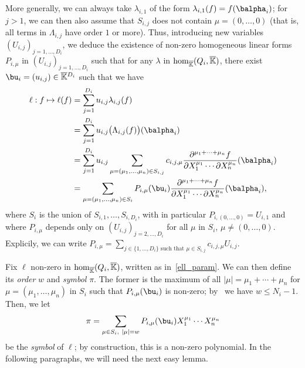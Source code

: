 \documentclass[12pt]{article}
\def\Kbar {{\ensuremath{\overline{\mathbb{K}}}}}
\begin{document}
More generally, we can always take $\lambda_{i,1}$ of the form
$\lambda_{i,1}(f) = f(\balpha_i)$; for $j>1$, we can then also assume
that $S_{i,j}$ does not contain $\mu=(0,\dots,0)$ (that is, all terms
in $\Lambda_{i,j}$ have order $1$ or more). Thus, introducing new
variables $(U_{i,j})_{j =1,\dots,D_i}$, we deduce the existence of
non-zero homogeneous linear forms $P_{i,\mu}$ in
$(U_{i,j})_{j=1,\dots,D_i}$ such that for any $\lambda$ in ${\rm
	hom}_\Kbar(Q_i,\Kbar)$, there exist $\bu_i=(u_{i,j}) \in
\Kbar{}^{D_i}$ such that we have
\begin{align}\label{ell_param}
\ell: f \mapsto \ell(f)
&= \sum_{j=1}^{D_i} u_{i,j} \lambda_{i,j}(f)\nonumber\\
&= \sum_{j=1}^{D_i} u_{i,j} \big(\Lambda_{i,j}(f)\big)(\balpha_i)\nonumber\\
&= \sum_{j=1}^{D_i} u_{i,j}
\sum_{\mu=(\mu_1,\dots,\mu_n) \in
	S_{i,j}} c_{i,j,\mu} \frac{ \partial^{\mu_1 + \cdots + \mu_n} f}
{\partial X_1^{\mu_1} \cdots \partial X_n^{\mu_n}}(\balpha_i)\nonumber\\
&= \sum_{\mu=(\mu_1,\dots,\mu_n) \in S_i} P_{i,\mu}(\bu_i)
\frac{ \partial^{\mu_1 + \cdots + \mu_n} f}
{\partial X_1^{\mu_1} \cdots \partial X_n^{\mu_n}}(\balpha_i),
\end{align}
where $S_i$ is  the union of $S_{i,1},\dots,S_{i,D_i}$,
with in particular $P_{i,(0,\dots,0)}=U_{i,1}$ and where $P_{i,\mu}$
depends only on $(U_{i,j})_{j =2,\dots,D_i}$ for all $\mu$ in $S_i$,
$\mu \ne (0,\dots,0)$. Explicily, we can write $P_{i,\mu}=\sum_{j\in
	\{1,\dots,D_i\} \text{~such that~} \mu \in S_{i,j}} c_{i,j,\mu}
U_{i,j}$. 

Fix $\ell$ non-zero in ${\rm hom}_\Kbar(Q_i,\Kbar)$, written
as in~\eqref{ell_param}. We can then
define its {\em order} $w$ and {\em symbol} $\pi$. The former is
the maximum of all $|\mu|=\mu_1+\cdots+\mu_n$ for
$\mu=(\mu_1,\dots,\mu_n)$ in $S_i$ such that $P_{i,\mu}(\bu_i)$ is
non-zero; by~\cite[Lemma~3.3]{Mourrain97} we have $w \le
N_i-1$. Then, we let
$$\pi =\sum_{\mu \in S_i,\ |\mu|=w}P_{i,\mu}(\bu_i) X_1^{\mu_1} \cdots
X_n^{\mu_n}$$ be the {\em symbol} of $\ell$; by construction,
this is a non-zero polynomial. In the following paragraphs, we will
need the next easy lemma.
\end{document}
